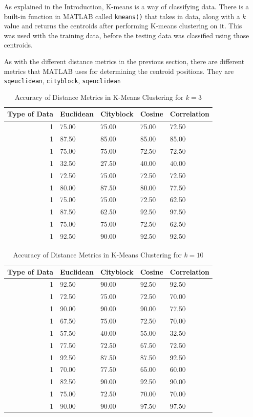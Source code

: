 \documentclass[a4paper, 10pt, conference]{ieeeconf}
\begin{document}
As explained in the Introduction, K-means is a way of classifying data. There is a built-in function in MATLAB called \texttt{kmeans()} that takes in data, along with a $k$ value and returns the centroids after performing K-means clustering on it. This was used with the training data, before the testing data was classified using those centroids.

As with the different distance metrics in the previous section, there are different metrics that MATLAB uses for determining the centroid positions. They are \texttt{sqeuclidean}, \texttt{cityblock}, \texttt{sqeuclidean}

\begin{table}[!ht]
\centering
\caption{Accuracy of Distance Metrics in K-Means Clustering for $k = 3$}
\label{tbl:k3}
\begin{tabular}{|r|llll|}
\hline
\textbf{Type of Data} & \textbf{Euclidean} & \textbf{Cityblock} & \textbf{Cosine} & \textbf{Correlation} \\ \hline
1 & 75.00 & 75.00 & 75.00 & 72.50\\
1 & 87.50 & 85.00 & 85.00 & 85.00\\
1 & 75.00 & 75.00 & 72.50 & 72.50\\
1 & 32.50 & 27.50 & 40.00 & 40.00\\
1 & 72.50 & 75.00 & 72.50 & 72.50\\
1 & 80.00 & 87.50 & 80.00 & 77.50\\
1 & 75.00 & 75.00 & 72.50 & 62.50\\
1 & 87.50 & 62.50 & 92.50 & 97.50\\
1 & 75.00 & 75.00 & 72.50 & 62.50\\
1 & 92.50 & 90.00 & 92.50 & 92.50\\ \hline
\end{tabular}
\end{table}

\begin{table}[!ht]
\centering
\caption{Accuracy of Distance Metrics in K-Means Clustering for $k = 10$}
\label{tbl:k10}
\begin{tabular}{|r|llll|}
\hline
\textbf{Type of Data} & \textbf{Euclidean} & \textbf{Cityblock} & \textbf{Cosine} & \textbf{Correlation} \\ \hline
1 & 92.50 & 90.00 & 92.50 & 92.50\\
1 & 72.50 & 75.00 & 72.50 & 70.00\\
1 & 90.00 & 90.00 & 90.00 & 77.50\\
1 & 67.50 & 75.00 & 72.50 & 70.00\\
1 & 57.50 & 40.00 & 55.00 & 32.50\\
1 & 77.50 & 72.50 & 67.50 & 72.50\\
1 & 92.50 & 87.50 & 87.50 & 92.50\\
1 & 70.00 & 77.50 & 65.00 & 60.00\\
1 & 82.50 & 90.00 & 92.50 & 90.00\\
1 & 75.00 & 72.50 & 70.00 & 70.00\\
1 & 90.00 & 90.00 & 97.50 & 97.50\\ \hline
\end{tabular}
\end{table}
\end{document}
